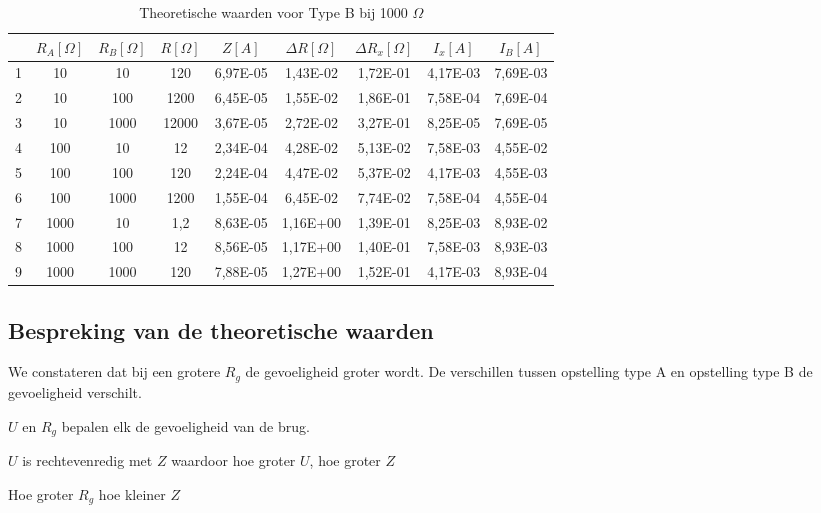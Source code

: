 \begin{table}[H]
    \centering
    \label{tab:TB1OO0}
    \caption{Theoretische waarden voor Type B bij 1000 $\Omega$}
    \begin{tabular}{| c | c | c | c | c | c | c | c | c |}
        \hline
                & $R_A [\Omega]$    & $R_B [\Omega]$    & $R [\Omega]$  & $Z [A]$   & $\Delta R [\Omega]$   & $\Delta R_x [\Omega]$ & $I_x [A]$                 & $I_B [A]$             \\ \hline
                1	&10	&10	&120	&6,97E-05	&1,43E-02	&1,72E-01	&4,17E-03	&7,69E-03 \\ \hline
                2	&10	&100	&1200	&6,45E-05	&1,55E-02	&1,86E-01	&7,58E-04	&7,69E-04\\ \hline
                3	&10	&1000	&12000	&3,67E-05	&2,72E-02	&3,27E-01	&8,25E-05	&7,69E-05\\ \hline
                4	&100	&10	&12	&2,34E-04	&4,28E-02	&5,13E-02	&7,58E-03	&4,55E-02\\ \hline
                5	&100	&100	&120	&2,24E-04	&4,47E-02	&5,37E-02	&4,17E-03	&4,55E-03\\ \hline
                6	&100	&1000	&1200	&1,55E-04	&6,45E-02	&7,74E-02	&7,58E-04	&4,55E-04\\ \hline
                7	&1000	&10	&1,2	&8,63E-05	&1,16E+00	&1,39E-01	&8,25E-03	&8,93E-02\\ \hline
                8	&1000	&100	&12	&8,56E-05	&1,17E+00	&1,40E-01	&7,58E-03	&8,93E-03\\ \hline
                9	&1000	&1000	&120	&7,88E-05	&1,27E+00	&1,52E-01	&4,17E-03	&8,93E-04  \\ \hline
    \end{tabular}
\end{table}
\subsection{Bespreking van de theoretische waarden}
We constateren dat bij een grotere $R_{g}$ de gevoeligheid groter wordt. 
De verschillen tussen opstelling type A en opstelling type B de gevoeligheid verschilt.

$U$ en $R_g$ bepalen elk de gevoeligheid van de brug.

$U$ is rechtevenredig met $Z$ waardoor hoe groter $U$, hoe groter
$Z$

Hoe groter $R_g$ hoe kleiner $Z$

